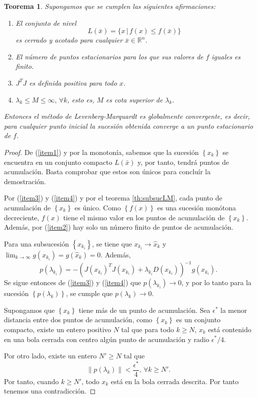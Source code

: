 \documentclass[11pt,a4paper]{book}
\newtheorem{theorem}{Teorema}[chapter]
\theoremstyle{definition}
\theoremstyle{remark}
\newcommand{\norm}[1]{\left\lVert#1\right\rVert}
\newcommand{\sucesionxk}{\left\{x_k\right\}}
\newcommand{\sucesion}[1]{\left\{#1\right\}}
\begin{document}
\begin{theorem}
	Supongamos que se cumplen las siguientes afirmaciones:
	\begin{enumerate}
		\item\label{item1}
		El conjunto de nivel
		\begin{equation*}
			L(\bar x) = \{x\,|\,f(x)\leq f(\bar x)\}
		\end{equation*}
		es cerrado y acotado para cualquier $\bar x \in \mathbb{R}^n$.
		\item\label{item2}
		El número de puntos estacionarios para los que sus valores de $f$
		iguales es finito.
		\item\label{item3}
		$J^TJ$ es definida positiva para todo $x$.
		\item\label{item4}
		$\lambda_k \leq M \leq \infty, \, \forall k$, esto es,
		$M$ es cota superior de $\lambda_k$.
	\end{enumerate}
	Entonces el método de Levenberg-Marquardt es globalmente convergente, es decir, para cualquier punto inicial la sucesión obtenida converge a un punto estacionario de $f$.
\end{theorem}
\begin{proof}
De (\ref{item1}) y por la monotonía, sabemos que la sucesión $\sucesionxk$ se encuentra en un conjunto compacto $L(\bar x)$ y, por tanto, tendrá puntos de acumulación. Basta comprobar que estos son únicos para concluír la demostración.

Por (\ref{item3}) y (\ref{item4}) y por el teorema \ref{th:subsucLM}, cada punto de acumulación de $\sucesionxk$ es único. Como $\sucesion{f(x)}$ es una sucesión monótona decreciente, $f(x)$ tiene el mismo valor en los puntos de acumulación de $\sucesionxk$. Además, por (\ref{item2}) hay solo un número finito de puntos de acumulación.

Para una subsucesión $\sucesion{x_{k_i}}$, se tiene que $x_{k_i} \rightarrow \hat x_k$ y $\lim_{k\rightarrow\infty}g(x_{k_i})=g(\hat x_k)=0$. Además,
\begin{equation}
	p(\lambda_{k_i})=
	-(J(x_{k_i})^TJ(x_{k_i}) + \lambda_{k_i}D(x_{k_i}))^{-1}g(x_{k_i}).
\end{equation}
Se sigue entonces de (\ref{item3}) y (\ref{item4}) que $p(\lambda_{k_i})\rightarrow 0$, y por lo tanto para la sucesión $\sucesion{p(\lambda_k)}$, se cumple que $p(\lambda_k)\rightarrow 0$.

Supongamos que $\sucesionxk$ tiene más de un punto de acumulación. Sea $\epsilon^*$ la menor distancia entre dos puntos de acumulación, como $\sucesionxk$ es un conjunto compacto, existe un entero positivo $N$ tal que para todo $k \geq N$, $x_k$ está contenido en una bola cerrada con centro algún punto de acumulación y radio $\epsilon^*/4$.

Por otro lado, existe un entero $N'\geq N$ tal que
\begin{equation}
	\norm{p(\lambda_k)}<\frac{\epsilon^*}{4},\,\forall k\geq N'.
\end{equation}
Por tanto, cuando $k\geq N'$, todo $x_k$ está en la bola cerrada descrita. Por tanto tenemos una contradicción.
\end{proof}
\end{document}
